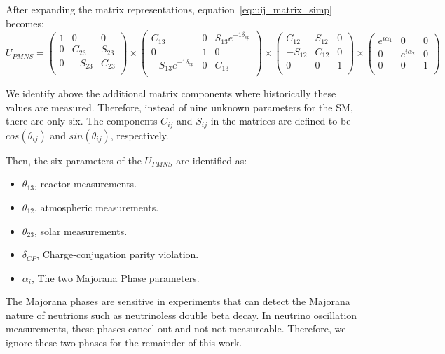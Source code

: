 After expanding the matrix representations, equation~\ref{eq:uij_matrix_simp} becomes:
\begin{equation}
U_{PMNS}
=
\begin{pmatrix}
1 & 0 & 0 \\
0 & C_{23} & S_{23} \\
0 & -S_{23} & C_{23} \\
\end{pmatrix}
\times
\begin{pmatrix}
C_{13} & 0 & S_{13}e^{-1\delta_{cp}} \\
0 & 1 & 0 \\
-S_{13}e^{-1\delta_{cp}} & 0 & C_{13} \\
\end{pmatrix}
\times
\begin{pmatrix}
C_{12} & S_{12} & 0 \\
-S_{12} & C_{12} & 0 \\
0 & 0 & 1 \\
\end{pmatrix}
\times
\begin{pmatrix}
e^{i\alpha_{1}} & 0 & 0 \\
0 & e^{i\alpha_{2}} & 0 \\
0 & 0 & 1 \\
\end{pmatrix}
\end{equation}


We identify above the additional matrix components where historically these values are measured.
Therefore, instead of nine unknown parameters for the SM, there are only six.
The components $C_{ij}$ and $S_{ij}$ in the matrices are defined to be $cos(\theta_{ij})$ and $sin(\theta_{ij})$, respectively.

Then, the six parameters of the $U_{PMNS}$ are identified as:

\begin{itemize}
    \item $\theta_{13}$, reactor measurements.
    \item $\theta_{12}$, atmospheric measurements.
    \item $\theta_{23}$, solar measurements.
    \item $\delta_{CP}$, Charge-conjugation parity violation.
    \item $\alpha_{i}$, The two Majorana Phase parameters.
\end{itemize}

The Majorana phases are sensitive in experiments that can detect the Majorana nature of neutrions such as neutrinoless double beta decay.
In neutrino oscillation measurements, these phases cancel out and not not measureable.
Therefore, we ignore these two phases for the remainder of this work.

